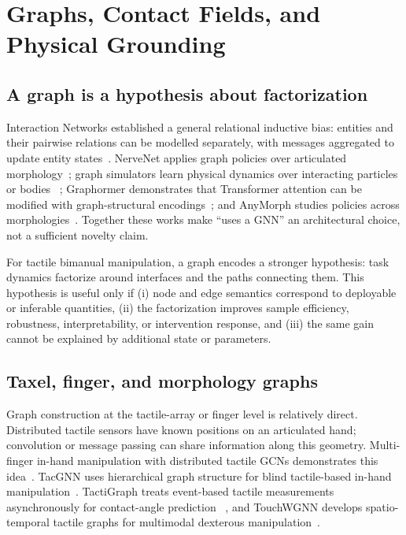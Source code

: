\section{Graphs, Contact Fields, and Physical Grounding}
\label{sec:structured}

\subsection{A graph is a hypothesis about factorization}

Interaction Networks established a general relational inductive bias: entities
and their pairwise relations can be modelled separately, with messages aggregated
to update entity states~\cite{battaglia2016interaction}. NerveNet applies graph
policies over articulated morphology~\cite{wang2018nervenet}; graph simulators
learn physical dynamics over interacting particles or bodies
~\cite{sanchez2020gns}; Graphormer demonstrates that Transformer attention can be
modified with graph-structural encodings~\cite{ying2021graphormer}; and AnyMorph
studies policies across morphologies~\cite{trabucco2022anymorph}. Together these
works make ``uses a GNN'' an architectural choice, not a sufficient novelty claim.

For tactile bimanual manipulation, a graph encodes a stronger hypothesis: task
dynamics factorize around interfaces and the paths connecting them. This
hypothesis is useful only if (i) node and edge semantics correspond to deployable
or inferable quantities, (ii) the factorization improves sample efficiency,
robustness, interpretability, or intervention response, and (iii) the same gain
cannot be explained by additional state or parameters.

\subsection{Taxel, finger, and morphology graphs}

Graph construction at the tactile-array or finger level is relatively direct.
Distributed tactile sensors have known positions on an articulated hand;
convolution or message passing can share information along this geometry.
Multi-finger in-hand manipulation with distributed tactile GCNs demonstrates this
idea~\cite{funabashi2022distributed}. TacGNN uses hierarchical graph structure for
blind tactile-based in-hand manipulation~\cite{yang2023tacgnn}. TactiGraph treats
event-based tactile measurements asynchronously for contact-angle prediction
~\cite{sajwani2023tactigraph}, and TouchWGNN develops spatio-temporal tactile
graphs for multimodal dexterous manipulation~\cite{ning2026touchwgnn}.

